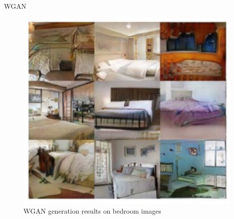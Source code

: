 \begin{frame}[allowframebreaks]{WGAN}
\framebreak
\begin{figure}
    \centering
    \includegraphics[height=0.8\textheight, width=\textwidth, keepaspectratio]{images/gan/wgan_5.png}
    \caption*{WGAN generation results on bedroom images}
\end{figure}

\end{frame}

